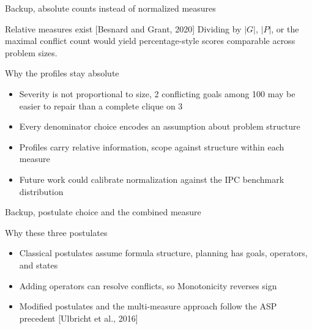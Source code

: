 \begin{frame}[noframenumbering]{Backup, absolute counts instead of normalized measures}
    \hypertarget{bk:normalization}{}
    \begin{exampleblock}{Relative measures exist [Besnard and Grant, 2020]}
        Dividing by $|G|$, $|P|$, or the maximal conflict count would yield percentage-style scores comparable across problem sizes.
    \end{exampleblock}

    \begin{block}{Why the profiles stay absolute}
        \begin{itemize}
            \item Severity is not proportional to size, 2 conflicting goals among 100 may be easier to repair than a complete clique on 3
            \item Every denominator choice encodes an assumption about problem structure
            \item Profiles carry relative information, scope against structure within each measure
            \item Future work could calibrate normalization against the IPC benchmark distribution
        \end{itemize}
    \end{block}

\end{frame}


\begin{frame}[noframenumbering]{Backup, postulate choice and the combined measure}
    \hypertarget{bk:postulates}{}
    \begin{block}{Why these three postulates}
        \begin{itemize}
            \item Classical postulates assume formula structure, planning has goals, operators, and states
            \item Adding operators can resolve conflicts, so Monotonicity reverses sign
            \item Modified postulates and the multi-measure approach follow the ASP precedent [Ulbricht et al., 2016]
        \end{itemize}
    \end{block}

\end{frame}

